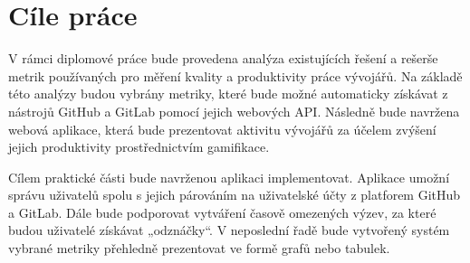 \section{Cíle práce}
V rámci diplomové práce bude provedena analýza existujících řešení a rešerše metrik používaných pro měření kvality a produktivity práce vývojářů. Na základě této analýzy budou vybrány metriky, které bude možné automaticky získávat z nástrojů GitHub a GitLab pomocí jejich webových API. Následně bude navržena webová aplikace, která bude prezentovat aktivitu vývojářů za účelem zvýšení jejich produktivity prostřednictvím gamifikace.

Cílem praktické části bude navrženou aplikaci implementovat. Aplikace umožní správu uživatelů spolu s jejich párováním na uživatelské účty z platforem GitHub a GitLab. Dále bude podporovat vytváření časově omezených výzev, za které budou uživatelé získávat „odznáčky“. V neposlední řadě bude vytvořený systém vybrané metriky přehledně prezentovat ve formě grafů nebo tabulek.
